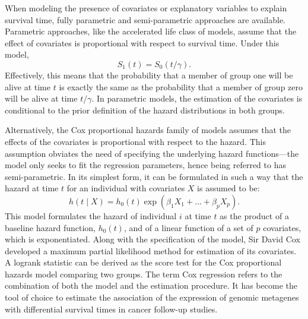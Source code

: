 When modeling the presence of covariates or explanatory variables to explain
survival time, fully parametric and semi-parametric approaches are available.
Parametric approaches, like the accelerated life class of models, assume that
the effect of covariates is proportional with respect to survival
time.\cite{kalbfleisch_statistical_2011} Under this model,
\begin{equation}
  \label{eq:aft}
  S_1(t) = S_0(t/\gamma).
\end{equation}
Effectively, this means that the probability that a member of group one will be
alive at time $t$ is exactly the same as the probability that a member of group
zero will be alive at time $t/\gamma$.  In parametric models, the estimation of
the covariates is conditional to the prior definition of the hazard
distributions in both groups.


Alternatively, the Cox proportional hazards family of models assumes that the
effects of the covariates is proportional with respect to the
hazard.\cite{cox_regression_1972} This assumption obviates the need of
specifying the underlying hazard functions---the model only seeks to fit the
regression parameters, hence being referred to has semi-parametric.  In its
simplest form, it can be formulated in such a way that the hazard at time $t$
for an individual with covariates $X$ is assumed to be:
\begin{equation}
  \label{eq:proportional-hazards}
  h(t \mid X)=h_0(t) \exp(\beta_1 X_{1}+\ldots+\beta_pX_{p}).
\end{equation}
This model formulates the hazard of individual $i$ at time $t$ as the product of
a baseline hazard function, $h_0(t)$, and of a linear function of a set of $p$
covariates, which is exponentiated.  Along with the specification of the model,
Sir David Cox developed a maximum partial likelihood method for estimation
of its covariates.\cite{cox_regression_1972} A logrank statistic can be
derived as the score test for the Cox proportional hazards model comparing two
groups.  The term Cox regression refers to the combination of both the model and
the estimation procedure.  It has become the tool of choice to estimate the
association of the expression of genomic metagenes with differential survival
times in cancer follow-up studies.

